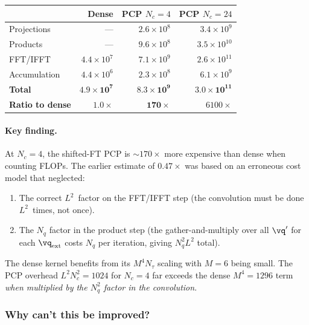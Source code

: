 \begin{center}
\renewcommand{\arraystretch}{1.3}
\begin{tabular}{l@{\quad}rrr}
  \toprule
  & Dense & PCP $N_c{=}4$ & PCP $N_c{=}24$ \\
  \midrule
  Projections
    & --- & $2.6 \times 10^8$ & $3.4 \times 10^9$ \\
  Products
    & --- & $9.6 \times 10^8$ & $3.5 \times 10^{10}$ \\
  FFT/IFFT
    & $4.4 \times 10^7$ & $7.1 \times 10^9$ & $2.6 \times 10^{11}$ \\
  Accumulation
    & $4.4 \times 10^6$ & $2.3 \times 10^8$ & $6.1 \times 10^9$ \\
  \midrule
  \textbf{Total}
    & $\mathbf{4.9 \times 10^7}$ & $\mathbf{8.3 \times 10^9}$ & $\mathbf{3.0 \times 10^{11}}$ \\
  \textbf{Ratio to dense}
    & $1.0\times$ & $\mathbf{170\times}$ & $6100\times$ \\
  \bottomrule
\end{tabular}
\end{center}

\paragraph{Key finding.}
At $N_c{=}4$, the shifted-FT PCP is $\sim\!170\times$ more expensive
than dense when counting FLOPs.  The earlier estimate of
$0.47\times$ was based on an erroneous cost model that neglected:
\begin{enumerate}
  \item The correct $L^2$~factor on the FFT/IFFT step (the
    convolution must be done $L^2$~times, not once).
  \item The $N_q$ factor in the product step (the gather-and-multiply
    over all $\vq'$ for each $\vq_\mathrm{ext}$ costs $N_q$ per
    iteration, giving $N_q^2 L^2$ total).
\end{enumerate}
The dense kernel benefits from its $M^4 N_\tau$ scaling with
$M{=}6$ being small.  The PCP overhead $L^2 N_c^2 = 1024$ for
$N_c{=}4$ far exceeds the dense $M^4 = 1296$ term \emph{when
multiplied by the $N_q^2$ factor in the convolution}.


\subsubsection{Why can't this be improved?}
\label{sssub:why_not}

